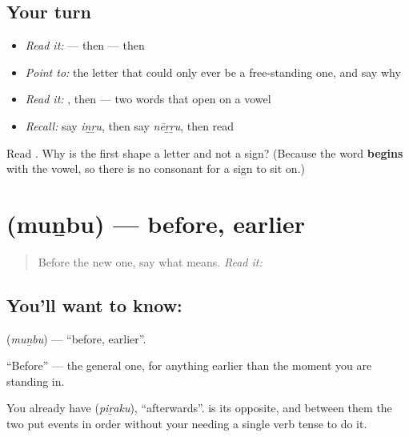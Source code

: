 \subsection*{Your turn}
\begin{itemize}
\raggedright
  \item \emph{Read it:} \textbf{} — then \textbf{} — then \textbf{}
  \item \emph{Point to:} the letter that could only ever be a free-standing one, and say why
  \item \emph{Read it:} \textbf{}, then \textbf{} — two words that open on a vowel
  \item \emph{Recall:} say \emph{iṉṟu}, then say \emph{nēṟṟu}, then read \textbf{}
\end{itemize}

\begin{tcolorbox}[breakable,colback=teal!4,colframe=teal!35!black,title={Before you move on}]
Read \textbf{}. Why is the first shape a letter and not a sign? (Because the word \textbf{begins} with the vowel, so there is no consonant for a sign to sit on.)
\end{tcolorbox}
\section[\texorpdfstring{\ta{முன்பு} (muṉbu)}{முன்பு (muṉbu)}]{ (muṉbu) — before, earlier}

\label{lesson:TA-C73-before}



\begin{quote}
Before the new one, say what \textbf{} means. \emph{Read it:} \textbf{}
\end{quote}

\subsection*{You'll want to know: }
\textbf{} (\emph{muṉbu}) — \textquotedblleft{}before, earlier\textquotedblright{}.

\textquotedblleft{}Before\textquotedblright{} — the general one, for anything earlier than the moment you are standing in.

You already have  (\emph{piṟaku}), \textquotedblleft{}afterwards\textquotedblright{}.  is its opposite, and between them the two put events in order without your needing a single verb tense to do it.


